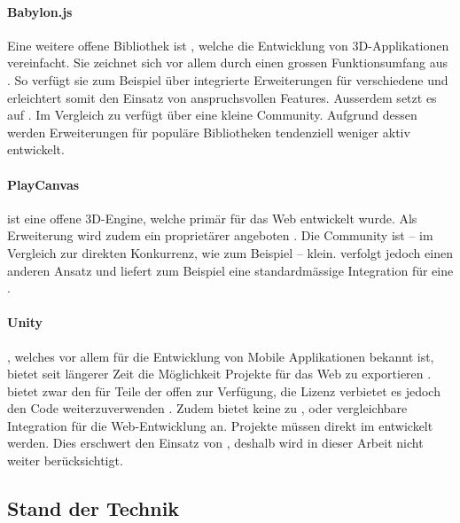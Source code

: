 \paragraph{Babylon.js}
Eine weitere offene Bibliothek ist , welche die Entwicklung von 3D-Applikationen vereinfacht. Sie zeichnet sich vor allem durch einen grossen Funktionsumfang aus \cite{babylonjsNpmPackage}. So verfügt sie zum Beispiel über integrierte Erweiterungen für verschiedene  und erleichtert somit den Einsatz von anspruchsvollen Features. Ausserdem setzt es auf .
Im Vergleich zu  verfügt  über eine kleine Community. Aufgrund dessen werden Erweiterungen für populäre Bibliotheken tendenziell weniger aktiv entwickelt.

\paragraph{PlayCanvas}
 ist eine offene 3D-Engine, welche primär für das Web entwickelt wurde. Als Erweiterung wird zudem ein proprietärer  angeboten \cite{playcanvasNpmPackage}. Die Community ist – im Vergleich zur direkten Konkurrenz, wie zum Beispiel  – klein.  verfolgt jedoch einen anderen Ansatz und liefert zum Beispiel eine standardmässige Integration für eine .

\paragraph{Unity}
, welches vor allem für die Entwicklung von Mobile Applikationen bekannt ist, bietet seit längerer Zeit die Möglichkeit Projekte für das Web zu exportieren \cite{unityWeb}.
 bietet zwar den  für Teile der  offen zur Verfügung, die Lizenz verbietet es jedoch den Code weiterzuverwenden \cite{unityOpenSource}.
Zudem bietet  keine zu ,  oder  vergleichbare Integration für die Web-Entwicklung an.  Projekte müssen direkt im  entwickelt werden. Dies erschwert den Einsatz von , deshalb wird   in dieser Arbeit nicht weiter berücksichtigt.

\subsection{Stand der Technik}

